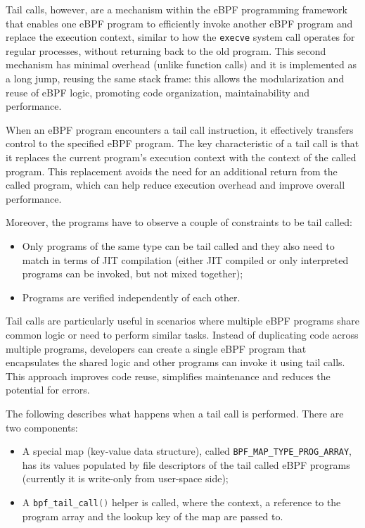 Tail calls, however, are a mechanism within the eBPF programming framework that enables one eBPF program to efficiently invoke another eBPF program and replace the execution context, similar to how the \colorbox{backcolour}{\lstinline[style=highlight, language=bash]|execve|} system call operates for regular processes, without returning back to the old program.
This second mechanism has minimal overhead (unlike function calls) and it is implemented as a long jump, reusing the same stack frame: this allows the modularization and reuse of eBPF logic, promoting code organization, maintainability and performance.

When an eBPF program encounters a tail call instruction, it effectively transfers control to the specified eBPF program.
The key characteristic of a tail call is that it replaces the current program's execution context with the context of the called program. 
This replacement avoids the need for an additional return from the called program, which can help reduce execution overhead and improve overall performance.

Moreover, the programs have to observe a couple of constraints to be tail called:

\begin{itemize}
	\item 
		Only programs of the same type can be tail called and they also need to match in terms of JIT compilation (either JIT compiled or only interpreted programs can be invoked, but not mixed together);
	\item 
		Programs are verified independently of each other.
\end{itemize}

Tail calls are particularly useful in scenarios where multiple eBPF programs share common logic or need to perform similar tasks. 
Instead of duplicating code across multiple programs, developers can create a single eBPF program that encapsulates the shared logic and other programs can invoke it using tail calls. 
This approach improves code reuse, simplifies maintenance and reduces the potential for errors.

The following describes what happens when a tail call is performed. 
There are two components:

\begin{itemize}
	\item 
		A special map (key-value data structure), called \colorbox{backcolour}{\lstinline[style=cstyle, language=C]|BPF_MAP_TYPE_PROG_ARRAY|}, has its values populated by file descriptors of the tail called eBPF programs (currently it is write-only from user-space side);
	\item 
		A \colorbox{backcolour}{\lstinline[style=cstyle, language=C]|bpf_tail_call()|} helper is called, where the context, a reference to the program array and the lookup key of the map are passed to. 
\end{itemize}

